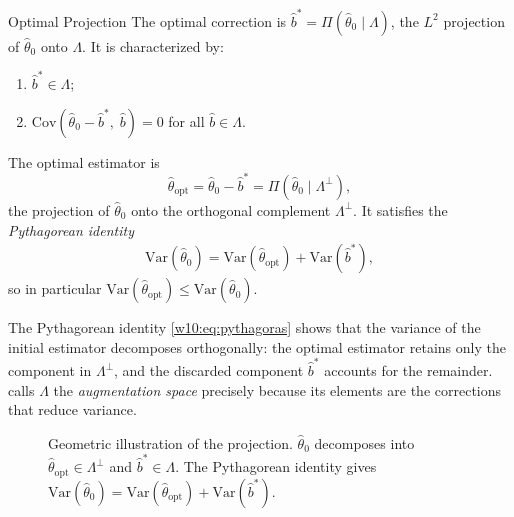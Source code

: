 \documentclass[master.tex]{subfiles}
\begin{document}
\begin{thm}{Optimal Projection}
\label{w10:thm:projection}
The optimal correction is $\hat b^* = \Pi(\hat\theta_0\mid\Lambda)$,
the $L^2$ projection of $\hat\theta_0$ onto $\Lambda$.  It is
characterized by:
\begin{enumerate}
  \item $\hat b^* \in \Lambda$;
  \item $\mathrm{Cov}(\hat\theta_0-\hat b^*,\;\hat b) = 0$ for
    all $\hat b \in \Lambda$.
\end{enumerate}
The optimal estimator is
\[
  \hat\theta_{\mathrm{opt}}
  = \hat\theta_0 - \hat b^*
  = \Pi(\hat\theta_0 \mid \Lambda^\perp),
\]
the projection of $\hat\theta_0$ onto the orthogonal complement
$\Lambda^\perp$.  It satisfies the \emph{Pythagorean identity}
\begin{align}
  \mathrm{Var}(\hat\theta_0)
  = \mathrm{Var}(\hat\theta_{\mathrm{opt}})
    + \mathrm{Var}(\hat b^*),
  \label{w10:eq:pythagoras}
\end{align}
so in particular
$\mathrm{Var}(\hat\theta_{\mathrm{opt}}) \leq
 \mathrm{Var}(\hat\theta_0)$.
\end{thm}

The Pythagorean identity \eqref{w10:eq:pythagoras} shows that the
variance of the initial estimator decomposes orthogonally: the
optimal estimator retains only the component in $\Lambda^\perp$, and
the discarded component $\hat b^*$ accounts for the remainder.
\citet{tsiatis2006semiparametric} calls $\Lambda$ the
\emph{augmentation space} precisely because its elements are the
corrections that reduce variance.

\begin{figure}[h]
\centering
{}
\caption{Geometric illustration of the projection.
$\hat\theta_0$ decomposes into $\hat\theta_{\mathrm{opt}} \in
\Lambda^\perp$ and $\hat b^* \in \Lambda$.
The Pythagorean identity gives
$\mathrm{Var}(\hat\theta_0)
 = \mathrm{Var}(\hat\theta_{\mathrm{opt}})
 + \mathrm{Var}(\hat b^*)$.}
\label{w10:fig:projection}
\end{figure}
\end{document}
